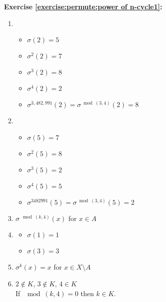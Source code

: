 \noindent\textbf{Exercise \ref{exercise:permute:power of n-cycle1}:}
\begin{enumerate}[{a.}]
\item
	\begin{itemize}
	\item
	$\sigma(2) = 5$
	
	\item
	$\sigma^2(2) = 7$
	
	\item
	$\sigma^3(2) = 8$
	
	\item
	$\sigma^4(2) = 2$
	
	\item
	$\sigma^{3,482,991}(2) = \sigma^{\bmod{(3,4)}}(2) = 8$
	\end{itemize}
	
\item
	\begin{itemize}
	\item
	$\sigma(5) = 7$
	
	\item
	$\sigma^2(5) = 8$
	
	\item
	$\sigma^3(5) = 2$
	
	\item
	$\sigma^4(5) = 5$
	
	\item
	$\sigma^{3482991}(5) = \sigma^{\bmod{(3,4)}}(5) = 2$
	\end{itemize}
	
\item
$\sigma^{\mod(k,4)}(x)$ for $x\in A$

\item
	\begin{multicols}{2}
	\begin{itemize}
	\item
	$\sigma(1) = 1$
	
	\item
	$\sigma(3) = 3$
	\end{itemize}
	\end{multicols}
	
\item
$\sigma^k(x) = x$ for $x\in X\setminus A$

\item 
$2\not\in K$, $3\not\in K$, $4\in K$\\
If $\mod(k,4) = 0$ then $k\in K$.
\end{enumerate}

